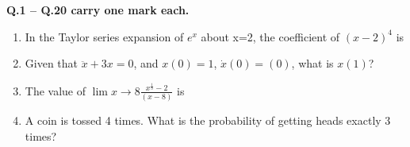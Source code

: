 \documentclass[journal,12pt,onecolumn]{IEEEtran}
\begin{document}
\newpage

\large\textbf{Q.1 -- Q.20 carry one mark each.}\\
\begin{enumerate}
    \item In the Taylor series expansion of $e^x$ about x=2, the coefficient of $(x-2)^4$ is
          \begin{enumerate}
          \end{enumerate}

    \item Given that $\ddot{x} + 3x = 0$, and $x(0)=1$, $\dot{x}(0)=(0)$, what is $x(1)$?
          \begin{enumerate}
          \end{enumerate}

    \item The value of $\lim{x\rightarrow8} \frac{x^{\frac{1}{3}}-2}{(x-8)}$ is
          \begin{enumerate}
          \end{enumerate}

    \item A coin is tossed 4 times. What is the probability of getting heads exactly 3 times?
          \begin{enumerate}
          \end{enumerate}


\end{enumerate}
\end{document}
